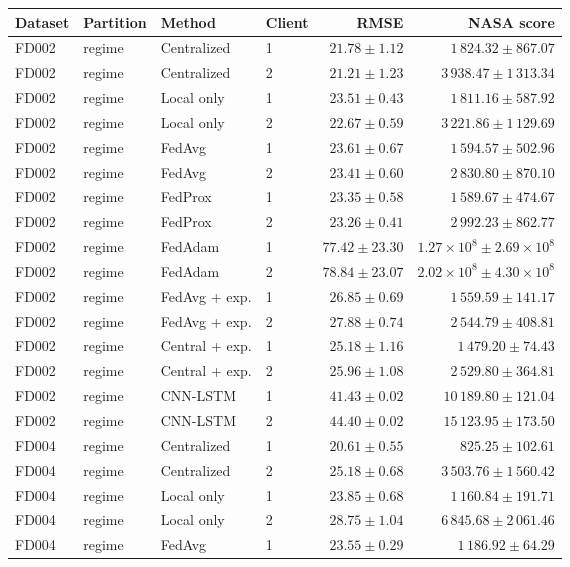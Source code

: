 \begin{tabular}{llllrr}
\toprule
Dataset & Partition & Method & Client & RMSE & NASA score \\
\midrule
FD002 & regime & Centralized & 1 & $21.78\pm1.12$ & $1\,824.32\pm867.07$ \\
FD002 & regime & Centralized & 2 & $21.21\pm1.23$ & $3\,938.47\pm1\,313.34$ \\
FD002 & regime & Local only & 1 & $23.51\pm0.43$ & $1\,811.16\pm587.92$ \\
FD002 & regime & Local only & 2 & $22.67\pm0.59$ & $3\,221.86\pm1\,129.69$ \\
FD002 & regime & FedAvg & 1 & $23.61\pm0.67$ & $1\,594.57\pm502.96$ \\
FD002 & regime & FedAvg & 2 & $23.41\pm0.60$ & $2\,830.80\pm870.10$ \\
FD002 & regime & FedProx & 1 & $23.35\pm0.58$ & $1\,589.67\pm474.67$ \\
FD002 & regime & FedProx & 2 & $23.26\pm0.41$ & $2\,992.23\pm862.77$ \\
FD002 & regime & FedAdam & 1 & $77.42\pm23.30$ & $1.27\times10^{8}\pm2.69\times10^{8}$ \\
FD002 & regime & FedAdam & 2 & $78.84\pm23.07$ & $2.02\times10^{8}\pm4.30\times10^{8}$ \\
FD002 & regime & FedAvg + exp. & 1 & $26.85\pm0.69$ & $1\,559.59\pm141.17$ \\
FD002 & regime & FedAvg + exp. & 2 & $27.88\pm0.74$ & $2\,544.79\pm408.81$ \\
FD002 & regime & Central + exp. & 1 & $25.18\pm1.16$ & $1\,479.20\pm74.43$ \\
FD002 & regime & Central + exp. & 2 & $25.96\pm1.08$ & $2\,529.80\pm364.81$ \\
FD002 & regime & CNN-LSTM & 1 & $41.43\pm0.02$ & $10\,189.80\pm121.04$ \\
FD002 & regime & CNN-LSTM & 2 & $44.40\pm0.02$ & $15\,123.95\pm173.50$ \\
FD004 & regime & Centralized & 1 & $20.61\pm0.55$ & $825.25\pm102.61$ \\
FD004 & regime & Centralized & 2 & $25.18\pm0.68$ & $3\,503.76\pm1\,560.42$ \\
FD004 & regime & Local only & 1 & $23.85\pm0.68$ & $1\,160.84\pm191.71$ \\
FD004 & regime & Local only & 2 & $28.75\pm1.04$ & $6\,845.68\pm2\,061.46$ \\
FD004 & regime & FedAvg & 1 & $23.55\pm0.29$ & $1\,186.92\pm64.29$ \\

\end{tabular}
